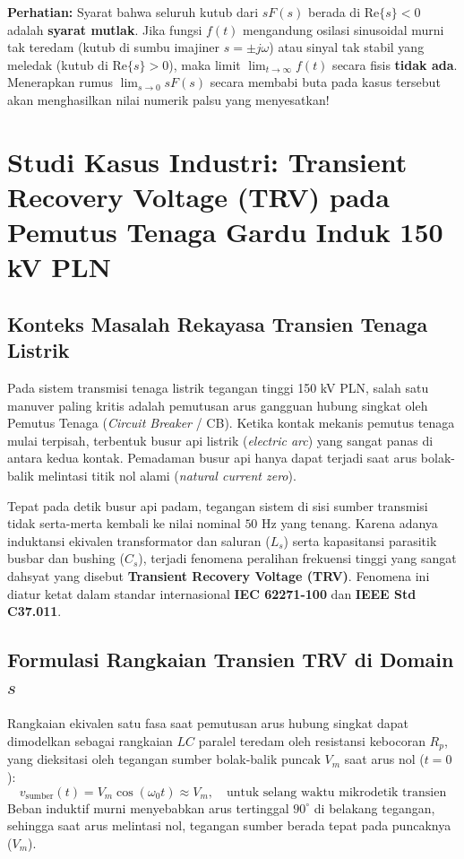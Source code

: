 \documentclass[11pt,a4paper]{article}
\theoremstyle{definition}
\begin{document}
\begin{tcolorbox}[colback=red!5!white,colframe=red!75!black,title=\textbf{Peringatan Kritis Aplikasi Teorema Nilai Akhir (FVT)}]
\textbf{Perhatian:} Syarat bahwa seluruh kutub dari $sF(s)$ berada di $\text{Re}\{s\} < 0$ adalah \textbf{syarat mutlak}. Jika fungsi $f(t)$ mengandung osilasi sinusoidal murni tak teredam (kutub di sumbu imajiner $s = \pm j\omega$) atau sinyal tak stabil yang meledak (kutub di $\text{Re}\{s\} > 0$), maka limit $\lim_{t \to \infty} f(t)$ secara fisis \textbf{tidak ada}. Menerapkan rumus $\lim_{s \to 0} s F(s)$ secara membabi buta pada kasus tersebut akan menghasilkan nilai numerik palsu yang menyesatkan!
\end{tcolorbox}

\section{Studi Kasus Industri: Transient Recovery Voltage (TRV) pada Pemutus Tenaga Gardu Induk 150 kV PLN}

\subsection{Konteks Masalah Rekayasa Transien Tenaga Listrik}
Pada sistem transmisi tenaga listrik tegangan tinggi 150 kV PLN, salah satu manuver paling kritis adalah pemutusan arus gangguan hubung singkat oleh Pemutus Tenaga (\textit{Circuit Breaker} / CB). Ketika kontak mekanis pemutus tenaga mulai terpisah, terbentuk busur api listrik (\textit{electric arc}) yang sangat panas di antara kedua kontak. Pemadaman busur api hanya dapat terjadi saat arus bolak-balik melintasi titik nol alami (\textit{natural current zero}).

Tepat pada detik busur api padam, tegangan sistem di sisi sumber transmisi tidak serta-merta kembali ke nilai nominal $50\text{ Hz}$ yang tenang. Karena adanya induktansi ekivalen transformator dan saluran ($L_s$) serta kapasitansi parasitik busbar dan bushing ($C_s$), terjadi fenomena peralihan frekuensi tinggi yang sangat dahsyat yang disebut \textbf{Transient Recovery Voltage (TRV)}. Fenomena ini diatur ketat dalam standar internasional \textbf{IEC 62271-100} dan \textbf{IEEE Std C37.011}.

\subsection{Formulasi Rangkaian Transien TRV di Domain \texorpdfstring{$s$}{s}}
Rangkaian ekivalen satu fasa saat pemutusan arus hubung singkat dapat dimodelkan sebagai rangkaian $LC$ paralel teredam oleh resistansi kebocoran $R_p$, yang dieksitasi oleh tegangan sumber bolak-balik puncak $V_m$ saat arus nol ($t = 0$):
\begin{equation}
    v_{\text{sumber}}(t) = V_m \cos(\omega_0 t) \approx V_m, \quad \text{untuk selang waktu mikrodetik transien}
\end{equation}
Beban induktif murni menyebabkan arus tertinggal $90^\circ$ di belakang tegangan, sehingga saat arus melintasi nol, tegangan sumber berada tepat pada puncaknya ($V_m$).
\end{document}
